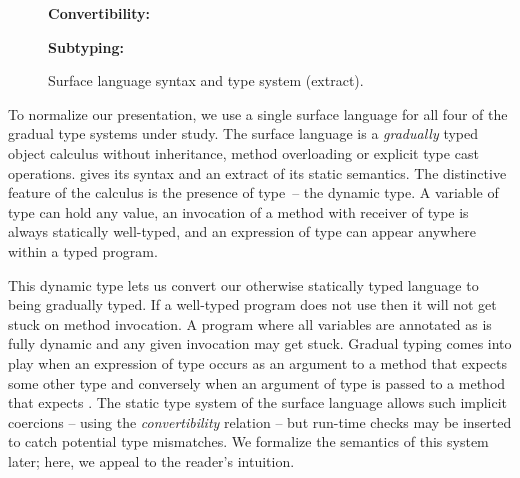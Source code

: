 \documentclass[USenglish]{tex/lipics-v2016}f
\begin{document}
\begin{figure}[!t]
{\bf Convertibility:}\\[-6mm]
  
\begin{mathpar}
    
    
\end{mathpar}


{\bf Subtyping:}\\[-6mm]

\begin{mathpar}



\end{mathpar}

\hrulefill
\caption{Surface language syntax and type system (extract).}\label{slts}
\end{figure}

To normalize our presentation, we use a single surface language for all
four of the gradual type systems under study. The surface language is  a
\emph{gradually} typed object calculus without inheritance, method overloading
or explicit type cast operations.  gives its syntax and an
extract of its static semantics. The distinctive feature of the calculus  is
the presence of type \any\,-- the dynamic type. A variable of type \any can
hold any value, an invocation of a method with receiver of type \any is
always statically well-typed, and an expression of type \any can appear
anywhere within a typed program.

This dynamic type lets us convert our otherwise statically typed language to
being gradually typed. If a well-typed program does not use \any then it
will not get stuck on method invocation.  A program where all variables are
annotated as \any is fully dynamic and any given invocation may get
stuck. Gradual typing comes into play when an expression of type \any occurs
as an argument to a method that expects some other type \C and conversely
when an argument of type \C is passed to a method that expects \any. The
static type system of the surface language allows such implicit coercions --
using the \emph{convertibility} relation -- but run-time checks may be
inserted to catch potential type mismatches. We formalize the
semantics of this system later; here, we appeal to the reader's intuition.
\end{document}
